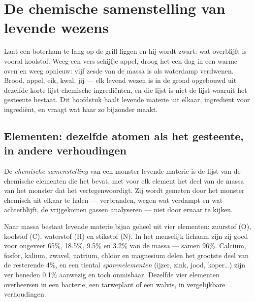 \chapter{De chemische samenstelling van levende wezens}\label{ch:g10:chemistry-of-life}

Laat een boterham te lang op de grill liggen en hij wordt zwart: wat
overblijft is vooral koolstof. Weeg een vers schijfje appel, droog het
een dag in een warme oven en weeg opnieuw: vijf zesde van de massa is
als waterdamp verdwenen. Brood, appel, eik, kwal, jij --- elk levend
wezen is in de grond opgebouwd uit dezelfde korte lijst chemische
ingrediënten, en die lijst is niet de lijst waaruit het gesteente
bestaat. Dit hoofdstuk haalt levende materie uit elkaar, ingrediënt
voor ingrediënt, en vraagt wat haar zo bijzonder maakt.

\section{Elementen: dezelfde atomen als het gesteente, in andere verhoudingen}

\begin{definition}\label{def:g10:chemistry-of-life:composition}
De \emph{chemische samenstelling} van een
monster levende materie is de lijst van de chemische elementen die het
bevat, met voor elk element het deel van de massa van het monster dat
het vertegenwoordigt. Zij wordt gemeten door het monster chemisch uit
elkaar te halen --- verbranden, wegen wat verdampt en wat achterblijft,
de vrijgekomen gassen analyseren --- niet door ernaar te kijken.
\end{definition}

\begin{proposition}\label{prop:g10:chemistry-of-life:four}
Naar massa bestaat levende materie bijna geheel uit vier elementen:
zuurstof (O), koolstof (C), waterstof (H) en stikstof (N). In het
menselijk lichaam zijn zij goed voor ongeveer 65\%, 18.5\%, 9.5\% en
3.2\% van de massa --- samen 96\%. Calcium, fosfor, kalium, zwavel,
natrium, chloor en magnesium delen het grootste deel van de resterende
4\%, en een tiental \emph{sporenelementen} (ijzer, zink, jood,
koper\dots) zijn ver beneden 0.1\% aanwezig en toch onmisbaar. Dezelfde
vier elementen overheersen in een bacterie, een tarweplant of een
walvis, in vergelijkbare verhoudingen.
\end{proposition}
\admitted

